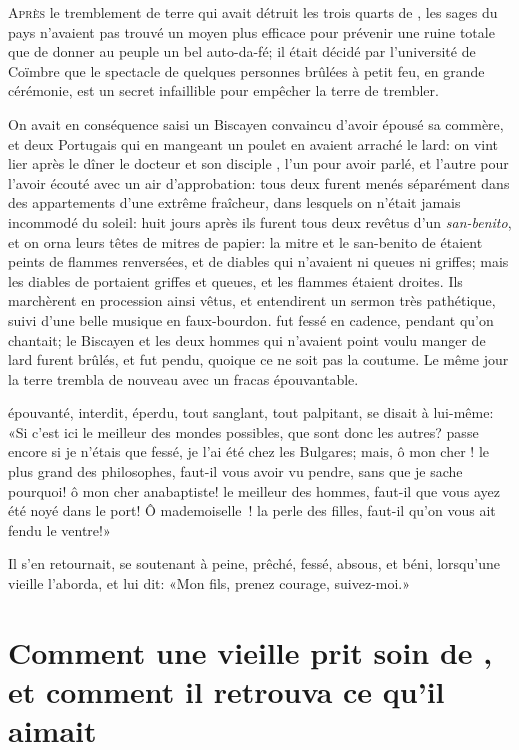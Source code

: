 \lettrine{A}{près} le tremblement de terre qui avait détruit les trois quarts de
, les sages du pays n’avaient pas trouvé un moyen plus efficace
pour prévenir une ruine totale que de donner au peuple un bel
auto-da-fé; il était décidé par l’université de Coïmbre que le
spectacle de quelques personnes brûlées à petit feu, en grande
cérémonie, est un secret infaillible pour empêcher la terre de
trembler.

On avait en conséquence saisi un Biscayen convaincu d’avoir épousé sa
commère, et deux Portugais qui en mangeant un poulet en avaient arraché
le lard: on vint lier après le dîner le docteur  et son
disciple , l’un pour avoir parlé, et l’autre pour l’avoir écouté
avec un air d’approbation: tous deux furent menés séparément dans des
appartements d’une extrême fraîcheur, dans lesquels on n’était jamais
incommodé du soleil: huit jours après ils furent tous deux 
revêtus d’un
\emph{san-benito}, et on orna leurs têtes de mitres de papier: la mitre et le
san-benito de  étaient peints de flammes renversées, et de
diables qui n’avaient ni queues ni griffes; mais les diables de
 portaient griffes et queues, et les flammes étaient droites.
Ils marchèrent en procession ainsi vêtus, et entendirent un sermon très
pathétique, suivi d’une belle musique en faux-bourdon.  fut
fessé en cadence, pendant qu’on chantait; le Biscayen et les deux
hommes qui n’avaient point voulu manger de lard furent 
brûlés, et
 fut pendu, quoique ce ne soit pas la coutume. Le même jour la
terre trembla de nouveau avec un fracas épouvantable.

 épouvanté, interdit, éperdu, tout sanglant, tout palpitant, se
disait à lui-même: «Si c’est ici le meilleur des mondes possibles, que
sont donc les autres? passe encore si je n’étais que fessé, je l’ai été
chez les Bulgares; mais, ô mon cher ! le plus grand des
philosophes, faut-il vous avoir vu pendre, sans que je sache pourquoi!
ô mon cher anabaptiste! le meilleur des hommes, faut-il que vous ayez
été noyé dans le port! Ô mademoiselle~! la perle des filles,
faut-il qu’on vous ait fendu le ventre!»

Il s’en retournait, se soutenant à peine, prêché, fessé, absous, et
béni, lorsqu’une vieille l’aborda, et lui dit: «Mon fils, prenez
courage, suivez-moi.»






\chapter[Comment une vieille prit soin de \bname{Candide}…]{Comment une vieille prit soin de ,\\et comment il retrouva ce
qu’il aimait}

